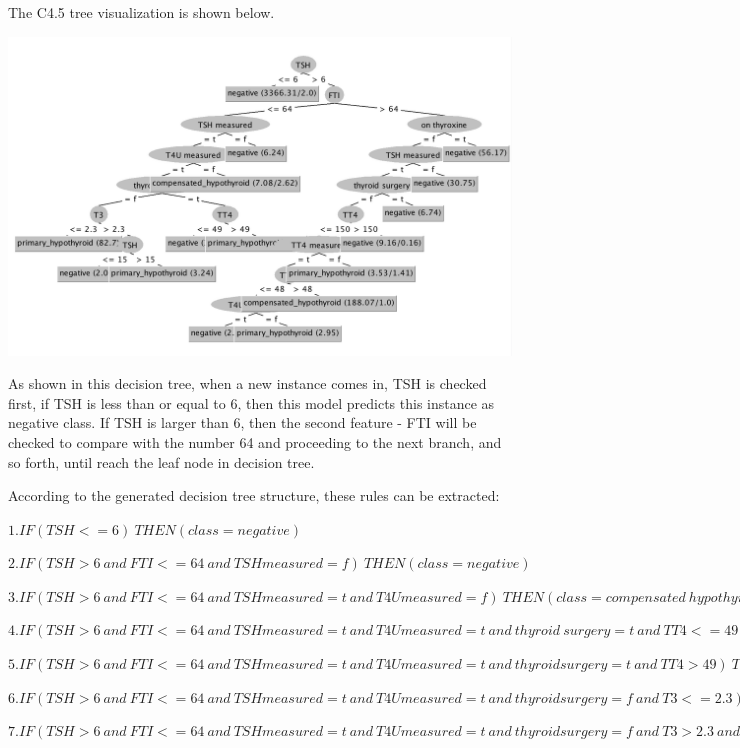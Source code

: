 \documentclass{article}
\begin{document}
The C4.5 tree visualization is shown below.

\includegraphics[scale=0.4]{tree_visualization.png}

As shown in this decision tree, when a new instance comes in, TSH is checked first, if TSH is less than or equal to 6, then this model predicts this instance as negative class. If TSH is larger than 6, then the second feature - FTI will be checked to compare with the number 64 and proceeding to the next branch, and so forth, until reach the leaf node in decision tree.

According to the generated decision tree structure, these rules can be extracted:

$1. IF(TSH<=6) \ THEN(class=negative)$

$2. IF(TSH>6 \ and \ FTI<=64 \ and \ TSH measured=f) \  THEN(class=negative)$

$3. IF(TSH>6 \ and \ FTI<=64 \ and \ TSH measured=t \ and \ T4U measured=f) \ THEN(class=compensated \ hypothyroid)$

$4. IF(TSH>6 \ and \ FTI<=64 \ and \ TSH measured=t \ and \ T4U measured=t \ and \ thyroid \ surgery=t \ and \ TT4<=49) \  THEN(class=negative)$

$5. IF(TSH>6 \ and \ FTI<=64 \ and \ TSH measured=t \ and \ T4U measured=t \ and \ thyroid surgery=t \ and \ TT4>49) \  THEN(class=primary \ hypothyroid)$

$6. IF(TSH>6 \ and \ FTI<=64 \ and \ TSH measured = t \ and \ T4U measured = t \ and \ thyroid surgery = f \ and \ T3<=2.3) THEN(class=primary \ hypothyroid)$

$7. IF(TSH>6 \ and \ FTI<=64 \ and \ TSH measured = t \ and \ T4U measured = t \ and \ thyroid surgery = f \ and \ T3>2.3 \ and \ TSH>15) \ THEN(class=primary \ hypothyroid)$
\end{document}
